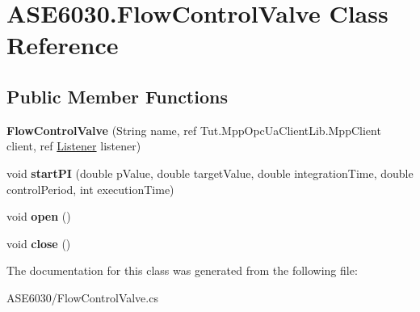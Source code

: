 \hypertarget{class_a_s_e6030_1_1_flow_control_valve}{}\section{A\+S\+E6030.\+Flow\+Control\+Valve Class Reference}
\label{class_a_s_e6030_1_1_flow_control_valve}
\subsection*{Public Member Functions}
\begin{DoxyCompactItemize}
\item 
\mbox{\label{class_a_s_e6030_1_1_flow_control_valve_a30ba36af47913e18552ee88461ad70b7}} 
{\bfseries Flow\+Control\+Valve} (String name, ref Tut.\+Mpp\+Opc\+Ua\+Client\+Lib.\+Mpp\+Client client, ref \hyperlink{class_a_s_e6030_1_1_listener}{Listener} listener)
\item 
\mbox{\label{class_a_s_e6030_1_1_flow_control_valve_a0a92ca1afb6da92e55a652e07361fd56}} 
void {\bfseries start\+PI} (double p\+Value, double target\+Value, double integration\+Time, double control\+Period, int execution\+Time)
\item 
\mbox{\label{class_a_s_e6030_1_1_flow_control_valve_a12db565b5451a4a7ee1e13ac7f031d00}} 
void {\bfseries open} ()
\item 
\mbox{\label{class_a_s_e6030_1_1_flow_control_valve_a4b22d19ca0ed6eb60f31705f2ee36dd7}} 
void {\bfseries close} ()
\end{DoxyCompactItemize}


The documentation for this class was generated from the following file\+:\begin{DoxyCompactItemize}
\item 
A\+S\+E6030/Flow\+Control\+Valve.\+cs\end{DoxyCompactItemize}
